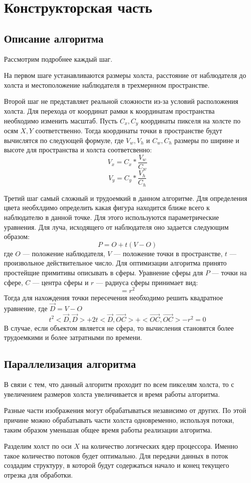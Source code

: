 \chapter{Конструкторская часть}

\section{Описание алгоритма}
Рассмотрим подробнее каждый шаг.

На первом шаге устанавливаются размеры холста, расстояние от наблюдателя до холста и местоположение наблюдателя в трехмернном пространстве.

Второй шаг не представляет реальной сложности из-за условий расположения холста. Для перехода от координат рамки к координатам пространства необходимо изменить масштаб. Пусть $C_{x}, C_{y}$ координаты пикселя на холсте по осям $X, Y$ соответственно. Тогда координаты точки в пространстве будут вычислятся по следующей формуле, где $V_{w}, V_{h}$ и $C_{w}, C_{h}$ размеры по ширине и высоте для пространства и холста соответсвенно: 
\[V_{x} = C_{x} * \frac{V_{w}}{C_{w}}\]
\[V_{y} = C_{y} * \frac{V_{h}}{C_{h}}\]

Третий шаг самый сложный и трудоемкий в данном алгоритме. Для определения цвета необхлдимо определить какая фигура находится ближе всего к наблюдателю в данной точке. Для этого используются параметрические уравнения. Для луча, исходящего от наблюдателя оно задается следующим образом: 
\[P = O  + t(V - O)\]
где $O$ --- положение наблюдателя, $V$ --- положение точки в пространстве, $t$ --- произвольное действительное число. Для оптимизации алгоритма принято простейщие примитивы описывать в сферы. Уравнение сферы для $P$ --- точки на сфере, $C$ --- центра сферы и $r$ --- радиуса сферы принимает вид:\newpage \[<P - C, P - C> = r^{2}\]
Тогда для нахождения точки пересечения необходимо решить квадратное уравнение, где $\vec{D} = V - O$
\[t^{2}<\vec{D},\vec{D}> + 2t<\vec{D},\vec{OC}> + <\vec{OC},\vec{OC}> - r^{2} = 0\]
В случае, если объектом является не сфера, то вычисления становятся более трудоемкими и более затратными по времени.

\section{Параллелизация алгоритма}
В связи с тем, что данный алгоритм проходит по всем пикселям холста, то с увеличением размеров холста увеличивается и время работы алгоритма. 

Разные части изображения могут обрабатываться независимо от других. По этой причине можно обрабатывать части холста одновременно, используя потоки, таким образом уменьшая общее время работы реализации алгоритма.

Разделим холст по оси $X$ на количество логических ядер процессора. Именно такое количество потоков будет оптимально. Для передачи данных в поток создадим структуру, в которой будут содержаться начало и конец текущего отрезка для обработки.

